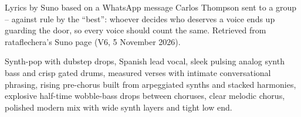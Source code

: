 
\label{sec:cada-voz-cuenta-igual}
\begin{notes}
Lyrics by Suno based on a WhatsApp message Carlos Thompson sent to a group -- against rule by the ``best'': whoever decides who deserves a voice ends up guarding the door, so every voice should count the same. Retrieved from rataflechera's Suno page (V6, 5 November 2026).
\end{notes}
\begin{style}
Synth-pop with dubstep drops, Spanish lead vocal, sleek pulsing analog synth bass and crisp gated drums, measured verses with intimate conversational phrasing, rising pre-chorus built from arpeggiated synths and stacked harmonies, explosive half-time wobble-bass drops between choruses, clear melodic chorus, polished modern mix with wide synth layers and tight low end.
\end{style}
